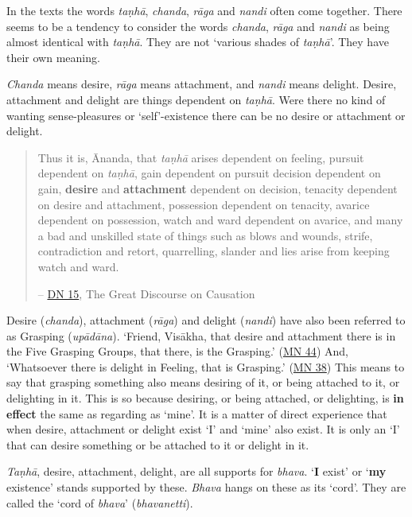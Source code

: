 In the texts the words \emph{taṇhā}, \emph{chanda}, \emph{rāga} and \emph{nandi} often come together. There seems to be a tendency to consider the words \emph{chanda}, \emph{rāga} and \emph{nandi} as being almost identical with \emph{taṇhā}. They are not `various shades of \emph{taṇhā}'. They have their own meaning.

\emph{Chanda} means desire, \emph{rāga} means attachment, and \emph{nandi} means delight. Desire, attachment and delight are things dependent on \emph{taṇhā}. Were there no kind of wanting sense-pleasures or `self'-existence there can be no desire or attachment or delight.

\begin{quote}
Thus it is, Ānanda, that \emph{taṇhā} arises dependent on feeling, pursuit dependent on \emph{taṇhā}, gain dependent on pursuit decision dependent on gain, \textbf{desire} and \textbf{attachment} dependent on decision, tenacity dependent on desire and attachment, possession dependent on tenacity, avarice dependent on possession, watch and ward dependent on avarice, and many a bad and unskilled state of things such as blows and wounds, strife, contradiction and retort, quarrelling, slander and lies arise from keeping watch and ward.

 -- \href{https://suttacentral.net/dn15/en/bodhi}{DN 15}, The Great Discourse on Causation
\end{quote}

Desire (\emph{chanda}), attachment (\emph{rāga}) and delight (\emph{nandi}) have also been referred to as Grasping (\emph{upādāna}). `Friend, Visākha, that desire and attachment there is in the Five Grasping Groups, that there, is the Grasping.' (\href{https://suttacentral.net/mn44/en/sujato}{MN 44}) And, `Whatsoever there is delight in Feeling, that is Grasping.' (\href{https://suttacentral.net/mn38/en/bodhi}{MN 38}) This means to say that grasping something also means desiring of it, or being attached to it, or delighting in it. This is so because desiring, or being attached, or delighting, is \textbf{in effect} the same as regarding as `mine'. It is a matter of direct experience that when desire, attachment or delight exist `I' and `mine' also exist. It is only an `I' that can desire something or be attached to it or delight in it.

\emph{Taṇhā}, desire, attachment, delight, are all supports for \emph{bhava}. `\textbf{I} exist' or `\textbf{my} existence' stands supported by these. \emph{Bhava} hangs on these as its `cord'. They are called the `cord of \emph{bhava}' (\emph{bhavanetti}).

